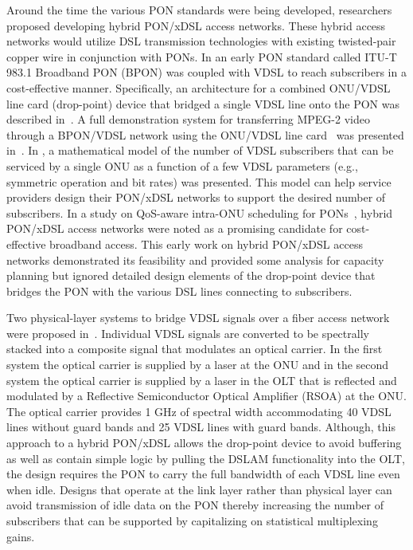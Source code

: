 \documentclass[pdftex,journal]{IEEEtran}
\begin{document}
Around the time the various PON standards were being developed,
researchers proposed developing hybrid PON/xDSL access networks. These
hybrid access networks would utilize DSL transmission technologies
with existing twisted-pair copper wire in conjunction with PONs. In
\cite{CB0300,CBABB0601} an early PON standard called ITU-T 983.1
Broadband PON (BPON) was coupled with VDSL to reach subscribers in a
cost-effective manner. Specifically,
an architecture for a combined ONU/VDSL line card (drop-point) device
that bridged a single VDSL line onto the PON was described in~\cite{CB0300}.
A full demonstration system for transferring MPEG-2 video through a
BPON/VDSL network using the ONU/VDSL line card~\cite{CB0300} was
presented in~\cite{CBABB0601}. In \cite{R0903}, a mathematical model
of the number of VDSL subscribers that can be serviced by a single
ONU as a function of a few VDSL parameters (e.g., symmetric
operation and bit rates) was presented. This model can help service
providers design their PON/xDSL networks to support the desired
number of subscribers. In a study on QoS-aware intra-ONU scheduling
for PONs~\cite{AYD1203}, hybrid PON/xDSL access networks were noted
as a promising candidate for cost-effective broadband access. This
early work on hybrid PON/xDSL access networks demonstrated its
feasibility and provided some analysis for capacity planning but
ignored detailed design elements of the drop-point device that
bridges the PON with the various DSL lines connecting to
subscribers.

Two physical-layer systems to bridge VDSL signals over a fiber
access network were proposed in~\cite{LTTBAPW0805}. Individual VDSL
signals are converted to be spectrally stacked into a composite
signal that modulates an optical carrier.  In the first system the
optical carrier is supplied by a laser at the ONU and in the second
system the optical carrier is supplied by a laser in the OLT that is
reflected and modulated by a Reflective Semiconductor Optical
Amplifier (RSOA) at the ONU. The optical carrier provides 1 GHz of
spectral width accommodating 40 VDSL lines without guard bands and
25 VDSL lines with guard bands. Although, this approach to a hybrid
PON/xDSL allows the drop-point device to avoid buffering as well as
contain simple logic by pulling the DSLAM functionality into the
OLT, the design requires the PON to carry the full bandwidth of each
VDSL line even when idle. Designs that operate at the link layer
rather than physical layer can avoid transmission of idle data on
the PON thereby increasing the number of subscribers that can be
supported by capitalizing on statistical multiplexing gains.
\end{document}
